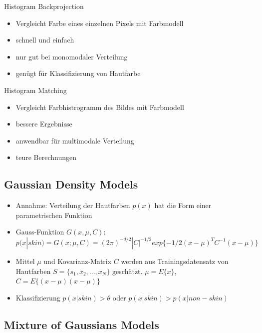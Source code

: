 \documentclass[paper=a4, fontsize=11pt]{scrartcl} %
\numberwithin{equation}{section} %
\numberwithin{figure}{section} %
\numberwithin{table}{section} %
\begin{document}
\begin{minipage}{0.45\textwidth}
\begin{center}
Histogram Backprojection
\end{center}
\begin{itemize}
\item Vergleicht Farbe eines einzelnen Pixels mit Farbmodell
\item schnell und einfach
\item nur gut bei monomodaler Verteilung
\item genügt für Klassifizierung von Hautfarbe
\end{itemize}
\end{minipage} \hfill
\begin{minipage}{0.45\textwidth}
\begin{center}
Histogram Matching
\end{center}
\begin{itemize}
\item Vergleicht Farbhistrogramm des Bildes mit Farbmodell
\item bessere Ergebnisse
\item anwendbar für multimodale Verteilung
\item teure Berechnungen
\end{itemize}
\end{minipage}

\subsection{Gaussian Density Models}

\begin{itemize}
\item Annahme: Verteilung der Hautfarben $p(x)$ hat die Form einer parametrischen Funktion
\item Gauss-Funktion $G(x, \mu, C)$: $p(x|skin) = G(x; \mu, C) = (2\pi)^{-d/2} |C|^{-1/2} exp\{-1/2(x-\mu)^T C^{-1} (x-\mu)\}$
\item Mittel $\mu$ und Kovarianz-Matrix $C$ werden aus Trainingsdatensatz von Hautfarben $S = \{s_1,x_2,...,x_N\}$ geschätzt. $\mu = E\{x\}$, $C = E\{(x-\mu)(x-\mu)\}$
\item Klassifizierung $p(x|skin) > \theta$ oder $p(x|skin) > p(x|non-skin)$
\end{itemize}

\subsection{Mixture of Gaussians Models}
\end{document}

